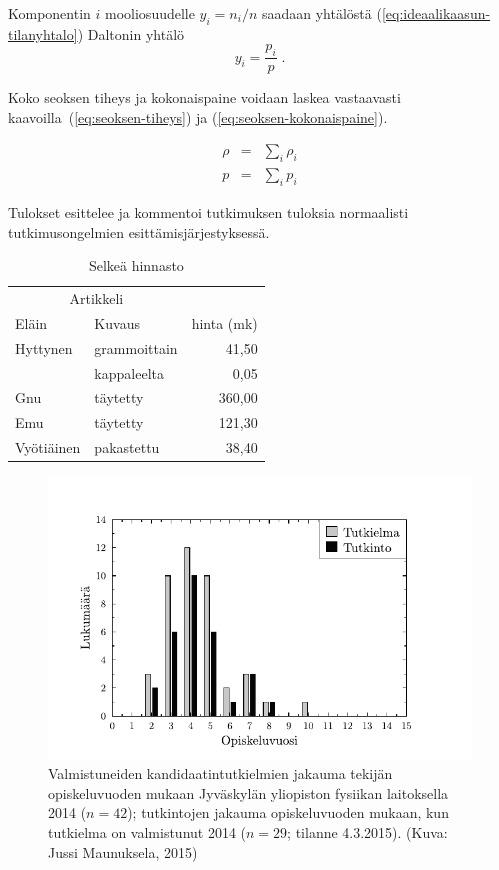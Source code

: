 \documentclass[final]{jyflluk}
\begin{document}
Komponentin $i$ mooliosuudelle $y_i = n_i/n$ saadaan yhtälöstä (\ref{eq:ideaalikaasun-tilanyhtalo}) Daltonin yhtälö
%
\begin{equation}
   \label{eq:daltonin-yhtalo}
   y_i = \frac{p_i}{p}\;.
\end{equation}

Koko seoksen tiheys ja kokonaispaine voidaan laskea vastaavasti kaavoilla~(\ref{eq:seoksen-tiheys}) ja (\ref{eq:seoksen-kokonaispaine}).

\begin{eqnarray}
   \rho & = & \sum_i \rho_i \label{eq:seoksen-tiheys} \\
   p & = & \sum_i p_i \label{eq:seoksen-kokonaispaine}
\end{eqnarray}




Tulokset esittelee ja kommentoi tutkimuksen tuloksia normaalisti tutkimusongelmien esittämisjärjestyksessä.

\begin{table}[h]
   \centering
   \caption{Selkeä hinnasto}
   \begin{tabular}{llr} \toprule
      \multicolumn{2}{c}{Artikkeli} \\ \cmidrule(r){1-2}
      Eläin    & Kuvaus       & hinta (mk) \\ \midrule
      Hyttynen & grammoittain &  41,50 \\
               & kappaleelta  &   0,05 \\
							
      Gnu      & täytetty     & 360,00 \\
      Emu      & täytetty     & 121,30 \\
      Vyötiäinen & pakastettu &  38,40 \\ \bottomrule
   \end{tabular}
\end{table}

\begin{figure}[htp]
   \centering
   \includegraphics[width=\textwidth]{tutkinnot}
   \caption{Valmistuneiden kandidaatintutkielmien jakauma tekijän opiskeluvuoden mukaan Jyväskylän yliopiston fysiikan laitoksella 2014 ($n = 42$); tutkintojen jakauma opiskeluvuoden mukaan, kun tutkielma on valmistunut 2014 ($n = 29$; tilanne 4.3.2015). (Kuva: Jussi Maunuksela, 2015)}
   \label{fig:esim-kuvio}
\end{figure}
\end{document}
